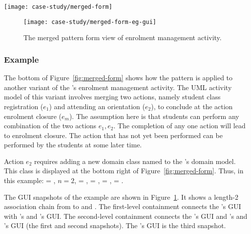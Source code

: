 \begin{figure*}%
	\begin{center}
		\texttt{[image: case-study/merged-form]}
	\end{center}
	\caption{The merged pattern form.} %
	\label{fig:merged-form}
\end{figure*}

\begin{figure}%
	\begin{center}
		\texttt{[image: case-study/merged-form-eg-gui]}
	\end{center}
	\caption{The merged pattern form view of enrolment management activity.} %
	\label{fig:merged-form-eg-gui}
\end{figure}

\subsubsection*{Example}
The bottom of Figure~\ref{fig:merged-form} shows how the pattern is applied to another variant of the \courseman's enrolment management activity. The UML activity model of this variant involves merging two actions, namely student class registration ($e_1$) and attending an orientation ($e_2$), to conclude at the action enrolment closure ($e_m$). The assumption here is that students can perform any combination of the two actions $e_1, e_2$. The completion of any one action will lead to enrolment closure. The action that has not yet been performed can be performed by the students at some later time.

Action $e_2$ requires adding a new domain class named  to the 's domain model. This class is displayed at the bottom right of Figure~\ref{fig:merged-form}. Thus, in this example:  = , $ n = 2 $,  = ,  = ,  = ,  = . 

The GUI snapshots of the example are shown in Figure~\ref{fig:merged-form-eg-gui}. It shows a length-2 association chain from  to  and . 
The first-level containment connects the 's GUI with 's and 's GUI. The second-level containment connects the 's GUI and 's and 's GUI (the first and second snapshots). The 's GUI is the third snapshot.

